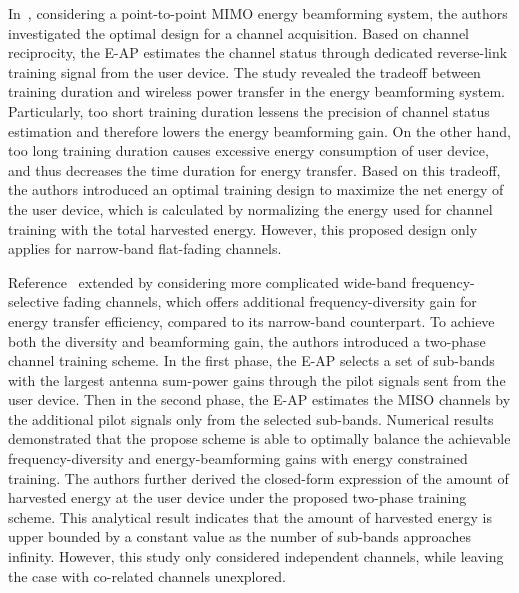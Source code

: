 \documentclass[twocolumn,10pt]{IEEEtran}
\begin{document}
In~\cite{Y.1403.7870Zeng}, considering a point-to-point MIMO energy beamforming system, the authors investigated the optimal design for a channel acquisition. Based on channel reciprocity, the E-AP estimates the channel status through dedicated reverse-link training signal from the user device. 
The study revealed the tradeoff between training duration and wireless power transfer in the energy beamforming system. Particularly, too short training duration lessens the precision of channel status estimation and therefore lowers the energy beamforming gain. On the other hand, too long training duration causes excessive energy consumption of user device, and thus decreases the time duration for energy transfer. Based on this tradeoff, the authors introduced an optimal training design to maximize the net energy of the user device, which is calculated by normalizing the energy used for channel training with the total harvested energy. However, this proposed design only applies for narrow-band flat-fading channels. 

Reference~\cite{Y.Zeng2015} extended \cite{Y.1403.7870Zeng} by considering more complicated wide-band frequency-selective fading channels, which offers additional frequency-diversity gain for energy transfer efficiency, compared to its narrow-band counterpart. To achieve both the diversity and beamforming gain, the authors introduced a two-phase channel training scheme. In the first phase, the E-AP selects a set of sub-bands with the largest antenna sum-power gains through the pilot signals sent from the user device. Then in the second phase, the E-AP estimates the MISO channels by the additional pilot signals only from the selected sub-bands. Numerical results demonstrated that the propose scheme is able to optimally balance the achievable frequency-diversity and energy-beamforming gains with energy constrained training. The authors further derived the closed-form expression of the amount of harvested energy at the user device under the proposed two-phase training scheme. This analytical result indicates that the amount of harvested energy is upper bounded by a constant value as the number of sub-bands approaches infinity. However, this study only considered independent channels, while leaving the case with co-related channels unexplored. 
\end{document}
